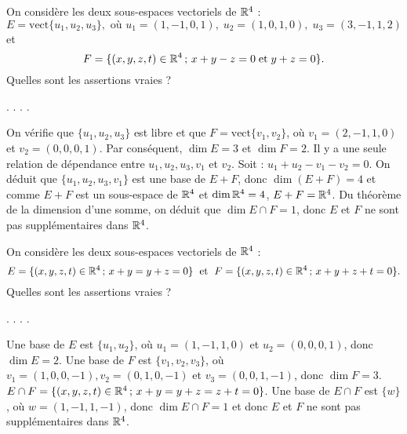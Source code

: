 \begin{question}
On considère les deux sous-espaces vectoriels de $\mathbb{R}^4$ : 
$$E= \mbox {vect} \{u_1,u_2,u_3\},\mbox{  où }u_1=(1,-1,0,1), \; u_2=(1,0,1,0),\; u_3=(3,-1,1,2)$$
et
$$F=\{(x,y,z,t)\in \mathbb{R}^4\, ;\, x+y-z=0\; \mbox{et}\; y+z=0\}.$$ 
Quelles sont les assertions vraies ?
\begin{answers}  
.
.
.
.
\end{answers}
\begin{explanations} On vérifie que $\{u_1,u_2,u_3\}$ est libre  et 
que $F=\mbox {vect} \{v_1,v_2\}$, où $v_1=(2,-1,1,0)$ et $ v_2=(0,0,0,1)$. Par conséquent, $\dim E=3$ et $\dim F=2$.
\vskip1mm
Il y a une seule relation de dépendance entre $u_1,u_2,u_3,v_1$ et $v_2$. Soit : $u_1+u_2-v_1-v_2=0$. On déduit que $\{u_1,u_2,u_3, v_1\}$ est une base de $E+F$, donc $\dim (E+F)=4$ et comme $E+F$ est un sous-espace de $\mathbb{R}^4$ et $\dim \mathbb{R}^4=4$, $E+F= \mathbb{R}^4$. Du théorème de la dimension d'une somme, on déduit que $\dim E\cap F=1$, donc $E$ et $F$ ne sont pas supplémentaires dans $\mathbb{R}^4$. 
\end{explanations}
\end{question}

\begin{question}
On considère les deux sous-espaces vectoriels de $\mathbb{R}^4$ :
$$E=\{(x,y,z,t)\in \mathbb{R}^4\, ; \, x+y = y+z=0\}\; \mbox{ et }\; F=\{(x,y,z,t)\in \mathbb{R}^4\, ;\, x+y+z+t=0\}.$$
Quelles sont les assertions vraies ?
\begin{answers}  
.
.
.
.
\end{answers}
\begin{explanations} Une base de $E$ est $\{u_1,u_2\}$, où $u_1= (1,-1,1,0)$ et $u_2= (0,0,0,1)$,  donc $\dim E=2$.
Une base de $F$ est $\{v_1,v_2,v_3\}$, où $v_1= (1,0,0,-1), v_2= (0,1,0,-1)$ et $v_3= (0,0,1,-1)$, donc $\dim F=3$.
$E\cap F =\{(x,y,z,t) \in \mathbb{R}^4 \, ; \, x+y = y+z=z+t=0\}$. Une base de $E\cap F$ est $\{w\}$, où $w=(1,-1,1,-1)$, donc 
$\dim E\cap F =1$ et donc $E$ et $F$ ne sont pas supplémentaires dans $\mathbb{R}^4$.
\end{explanations}
\end{question}

